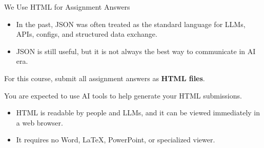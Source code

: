 
\begin{frame}{We Use HTML for Assignment Answers}

  \begin{itemize}
    \item In the past, JSON was often treated as the standard language for LLMs, APIs, configs, and structured data exchange.
    \item JSON is still useful, but it is not always the best way to communicate in AI era.
  \end{itemize}
\Large
  For this course, submit all assignment answers as
  \textbf{HTML files}.

  \medskip

  You are expected to use AI tools to help generate your HTML submissions.

  \normalsize
  \vspace{0.5em}

  \begin{itemize}
    \item HTML is readable by people and LLMs, and it can be viewed
          immediately in a web browser.

    \item It requires no Word, LaTeX, PowerPoint, or specialized viewer.
  \end{itemize}
\end{frame}



